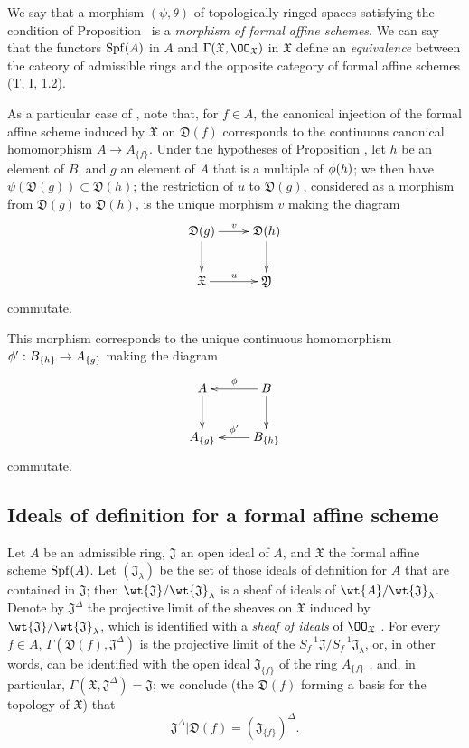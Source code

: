 We say that a morphism $(\psi,\theta)$ of topologically ringed spaces satisfying the condition of Proposition~ is a \emph{morphism of formal affine schemes}.
We can say that the functors $\operatorname{Spf}(A)$ in $A$ and $\Gamma(\mathfrak{X},\OO_\mathfrak{X})$ in $\mathfrak{X}$ define an \emph{equivalence} between the cateory of admissible rings and the opposite category of formal affine schemes (T, I, 1.2).

\begin{env}[10.2.3]
\label{1.10.2.3}
As a particular case of , note that, for $f\in A$, the canonical injection of the formal affine scheme induced by $\mathfrak{X}$ on $\mathfrak{D}(f)$ corresponds to the continuous canonical homomorphism $A\to A_{\{f\}}$.
Under the hypotheses of Proposition , let $h$ be an element of $B$, and $g$ an element of $A$ that is a multiple of $\phi(h)$;
we then have $\psi(\mathfrak{D}(g))\subset\mathfrak{D}(h)$; the restriction of $u$ to $\mathfrak{D}(g)$, considered as a morphism from $\mathfrak{D}(g)$ to $\mathfrak{D}(h)$, is the unique morphism $v$ making the diagram
\[
  \xymatrix{
    \mathfrak{D}(g)\ar[r]^v\ar[d] &
    \mathfrak{D}(h)\ar[d]\\
    \mathfrak{X}\ar[r]^u &
    \mathfrak{Y}
  }
\]
commutate.

This morphism corresponds to the unique continuous homomorphism $\vphi':B_{\{h\}}\to A_{\{g\}}$  making the diagram
\[
  \xymatrix{
    A\ar[d] &
    B\ar[l]_\vphi\ar[d]\\
    A_{\{g\}} &
    B_{\{h\}}\ar[l]_{\vphi'}
  }
\]
commutate.
\end{env}

\subsection{Ideals of definition for a formal affine scheme}
\label{subsection:1.10.3}

\begin{env}[10.3.1]
\label{1.10.3.1}
Let $A$ be an admissible ring, $\mathfrak{J}$ an open ideal of $A$, and $\mathfrak{X}$ the formal affine scheme $\operatorname{Spf}(A)$.
Let $(\mathfrak{J}_\lambda)$ be the set of those ideals of definition for $A$ that are contained in $\mathfrak{J}$; then $\wt{\mathfrak{J}}/\wt{\mathfrak{J}}_\lambda$ is a sheaf of ideals of $\wt{A}/\wt{\mathfrak{J}}_\lambda$.
Denote by $\mathfrak{J}^\Delta$ the projective limit of the sheaves on $\mathfrak{X}$ induced by $\wt{\mathfrak{J}}/\wt{\mathfrak{J}}_\lambda$, which is identified with a \emph{sheaf of ideals} of $\OO_\mathfrak{X}$ .
For every $f\in A$, $\Gamma(\mathfrak{D}(f),\mathfrak{J}^\Delta)$ is the projective limit of the $S_f^{-1}\mathfrak{J}/S_f^{-1}\mathfrak{J}_\lambda$, or, in other words, can be identified with the open ideal $\mathfrak{J}_{\{f\}}$ of the ring $A_{\{f\}}$ , and, in particular, $\Gamma(\mathfrak{X},\mathfrak{J}^\Delta)=\mathfrak{J}$; we conclude (the $\mathfrak{D}(f)$ forming a basis for the topology of $\mathfrak{X}$) that
\[
  \mathfrak{J}^\Delta|\mathfrak{D}(f)=(\mathfrak{J}_{\{f\}})^\Delta.
  \tag{10.3.1.1}
\]
\end{env}

